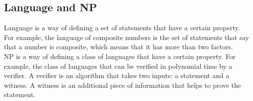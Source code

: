 \subsection{Language and NP}
Language is a way of defining a set of statements that have a certain property. For example, the language of composite numbers is the set of statements that say that a number is composite, which means that it has more than two factors.\\
NP is a way of defining a class of languages that have a certain property. For example, the class of languages that can be verified in polynomial time by a verifier. A verifier is an algorithm that takes two inputs: a statement and a witness. A witness is an additional piece of information that helps to prove the statement.

